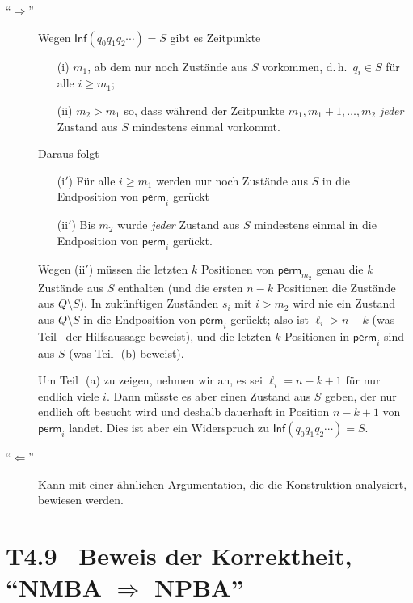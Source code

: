\documentclass[fontsize=11pt, twoside=false, numbers=autoenddot]{scrbook}
\begin{document}
\begin{description}
  \item[{\boldmath"`$\Rightarrow$"'}]
    Wegen $\textsf{Inf}(q_0q_1q_2\cdots)=S$ gibt es Zeitpunkte
    \begin{enumerate}
      \item[(i)]
        $m_1$, ab dem nur noch Zustände aus $S$ vorkommen,
        d.\,h.\ $q_i \in S$ für alle $i \geq m_1$;
      \item[(ii)]
        $m_2 > m_1$ so, dass während der Zeitpunkte $m_1,m_1+1,\dots,m_2$
        \emph{jeder} Zustand aus $S$ mindestens einmal vorkommt.
    \end{enumerate}
    Daraus folgt
    \begin{enumerate}
      \item[(i$'$)]
        Für alle $i \geq m_1$ werden nur noch Zustände aus $S$ in die Endposition von
        $\textsf{perm}_i$ gerückt
      \item[(ii$'$)]
        Bis $m_2$ wurde \emph{jeder} Zustand aus $S$ mindestens einmal in die 
        Endposition von
        $\textsf{perm}_i$ gerückt.
    \end{enumerate}
    Wegen (ii$'$) müssen die letzten $k$ Positionen von $\textsf{perm}_{m_2}$
    genau die $k$ Zustände aus $S$ enthalten
    (und die ersten $n-k$ Positionen die Zustände aus $Q\setminus S$).
    In zukünftigen Zuständen $s_i$ mit $i > m_2$ wird
    nie ein Zustand aus $Q\setminus S$ in die Endposition von $\textsf{perm}_i$ gerückt;
    also ist $\ell_i  > n-k$ (was Teil~ der Hilfsaussage beweist),
    und die letzten $k$ Positionen in $\textsf{perm}_i$ sind aus $S$
    (was Teil~\,(b) beweist).
    
    Um Teil~\,(a) zu zeigen, nehmen wir an, es sei $\ell_i = n-k+1$
    für nur endlich viele $i$.
    Dann müsste es aber einen Zustand aus $S$ geben, der nur endlich oft besucht wird
    und deshalb dauerhaft in Position $n-k+1$ von $\textsf{perm}_i$ landet.
    Dies ist aber ein Widerspruch zu $\textsf{Inf}(q_0q_1q_2\cdots)=S$.
  \item[{\boldmath"`$\Leftarrow$"'}]
    Kann mit einer ähnlichen Argumentation,
    die die Konstruktion analysiert,
    bewiesen werden.
    \qedhere
\end{description}

\section*{{\boldmath T4.9~ Beweis der Korrektheit, "`NMBA $\Rightarrow$ NPBA"'}}
\end{document}
